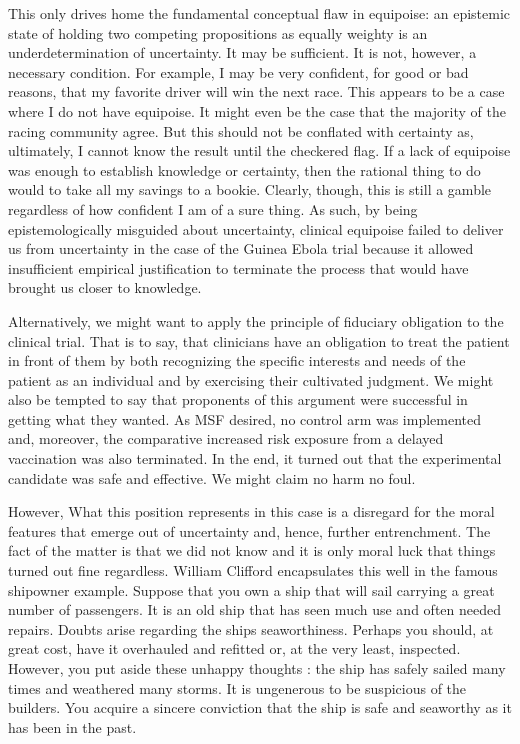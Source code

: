 \documentclass[letterpaper,notitlepage,12pt]{article}
\begin{document}
This only drives home the fundamental conceptual flaw in equipoise: an
epistemic state of holding two competing propositions as equally weighty is an
underdetermination of uncertainty.
It may be sufficient. It is not, however, a necessary condition.
For example, I may be very confident, for good or bad reasons, that my favorite 
driver will win the next race.
This appears to be a case where I do not have equipoise.
It might even be the case that the majority of the racing community agree.
But this should not be conflated with certainty as, ultimately, I cannot know
the result until the checkered flag.
If a lack of equipoise was enough to establish knowledge or certainty, then the
rational thing to do would to take all my savings to a bookie.
Clearly, though, this is still a gamble regardless of how confident I am of a
sure thing.
As such, by being epistemologically misguided about uncertainty,
clinical equipoise failed to deliver us from uncertainty in the case of the
Guinea Ebola trial because it allowed insufficient empirical justification to
terminate the process that would have brought us closer to knowledge.

Alternatively, we might want to apply the principle of fiduciary obligation to
the clinical trial.
That is to say, that clinicians have an obligation to treat the patient in front
of them by both recognizing the specific interests and needs of the patient as
an individual and by exercising their cultivated judgment.
We might also be tempted to say that proponents of this argument were successful
in getting what they wanted.
As MSF desired, no control arm was implemented and, moreover, the comparative
increased risk exposure from a delayed vaccination was also terminated.
In the end, it turned out that the experimental candidate was safe and
effective.
We might claim no harm no foul.

However, What this position represents in this case is a disregard for the moral
features that emerge out of uncertainty and, hence, further entrenchment.
The fact of the matter is that we did not know and it is only moral luck that
things turned out fine regardless.
William Clifford encapsulates this well in the famous shipowner example.
Suppose that you own a ship that will sail carrying a great number of
passengers.
It is an old ship that has seen much use and often needed repairs.
Doubts arise regarding the ships seaworthiness.
Perhaps you should, at great cost, have it overhauled and refitted or, at the
very least, inspected.
However, you put aside these unhappy thoughts : the ship has safely sailed many
times and weathered many storms.
It is ungenerous to be suspicious of the builders.
You acquire a sincere conviction that the ship is safe and seaworthy as it has
been in the past.
\end{document}
